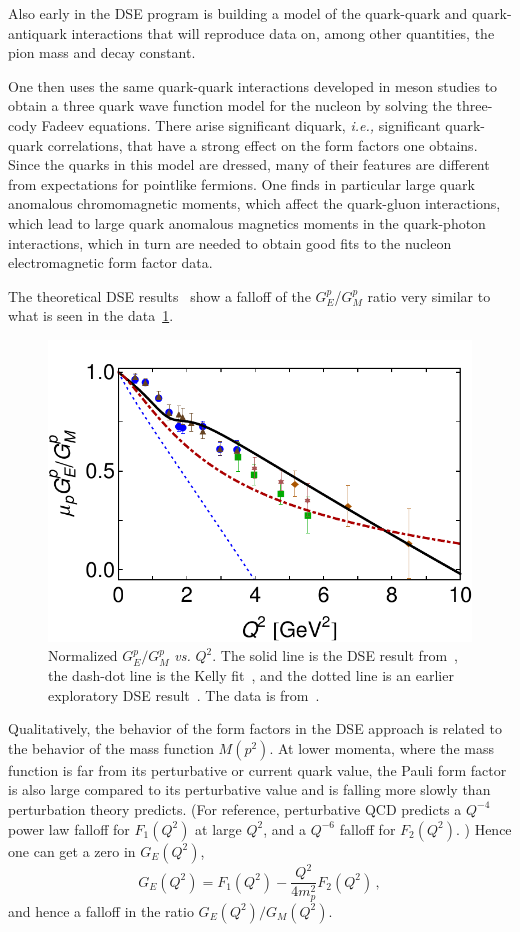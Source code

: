 Also early in the DSE program is building a model of the quark-quark and quark-antiquark interactions that will reproduce data on, among other quantities, the pion mass and decay constant.

One then uses the same quark-quark interactions developed in meson studies to obtain a three quark wave function model for the nucleon by solving the three-cody Fadeev equations.  There arise significant diquark, \textit{i.e.,} significant quark-quark correlations, that have a strong effect on the form factors one obtains.  Since the quarks in this model are dressed,  many of their features are different from expectations for pointlike fermions.  One finds in particular large quark anomalous chromomagnetic moments, which affect the quark-gluon interactions, which lead to large quark anomalous magnetics moments in the quark-photon interactions, which in turn are needed to obtain good fits to the nucleon electromagnetic form factor data.  

The theoretical DSE results~\cite{Cloet:2014rja,Cloet:2013gva,Cloet:2013jya} show a falloff of the $G_E^p$/$G_M^p$ ratio very similar to what is seen in the data~\ref{fig:segovia}.

\begin{figure}[htbp]
\begin{center}
\includegraphics[width = 83 mm]{F3Segovia.pdf}
\caption{Normalized $G_E^p/G_M^p$ \textit{vs.} $Q^2$.  The solid line is the DSE result from~\cite{Segovia:2014aza}, the dash-dot line is the Kelly fit~\cite{kelly04}, and the dotted line is an earlier exploratory DSE result~\cite{Wilson:2011aa}.  The data is from~\cite{jones,gayou:2002,punjabi05A,puckett:2010,puckett:2011}.}
\label{fig:segovia}
\end{center}
\end{figure}


Qualitatively, the behavior of the form factors in the DSE approach is related to the behavior of the mass function $M(p^2)$.  At lower momenta, where the mass function is far from its perturbative or current quark value, the Pauli form factor is also large compared to its perturbative value and is falling more slowly than perturbation theory predicts.  (For reference, perturbative QCD predicts a $Q^{-4}$ power law falloff for $F_1(Q^2)$ at large $Q^2$, and a $Q^{-6}$ falloff for $F_2(Q^2)$. )  Hence one can get a zero in $G_E(Q^2)$,
\begin{equation}
G_E(Q^2) = F_1(Q^2) - \frac{Q^2}{4 m_p^2} F_2(Q^2)	\,,
\end{equation}
and hence a falloff in the ratio $G_E(Q^2)/G_M(Q^2)$.

